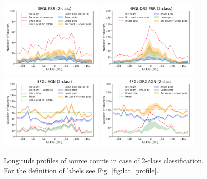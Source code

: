 \documentclass{aa}
\begin{document}
\begin{figure}[h]
\centering
\includegraphics[width=0.45\textwidth]{plots/lon_profile_PSR_3FGL_2classes.pdf}
\includegraphics[width=0.45\textwidth]{plots/lon_profile_PSR_4FGL-DR2_2classes.pdf} \\
\includegraphics[width=0.45\textwidth]{plots/lon_profile_AGN_3FGL_2classes.pdf}
\includegraphics[width=0.45\textwidth]{plots/lon_profile_AGN_4FGL-DR2_2classes.pdf}
\caption{Longitude profiles of source counts in case of 2-class classification. For the definition of labels see Fig. \ref{fig:lat_profile}.}  
\label{fig:lon_profile}
\end{figure}
\end{document}
